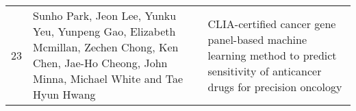 \documentclass[11pt]{article}
\begin{document}
{\begin{tabular}{p{1cm}p{8cm}p{8cm}}
23            & Sunho Park, Jeon Lee, Yunku Yeu, Yunpeng Gao, Elizabeth Mcmillan, Zechen Chong, Ken Chen, Jae-Ho Cheong, John Minna, Michael White and Tae Hyun Hwang                                                                                                                                                                                                                        & CLIA-certified cancer gene panel-based machine learning method to predict sensitivity of anticancer drugs for precision oncology  
\end{tabular}
}

\newpage

  \clearpage 
  \clearpage 
  \clearpage 
  \clearpage 
  \clearpage 
  \clearpage 
\end{document}
